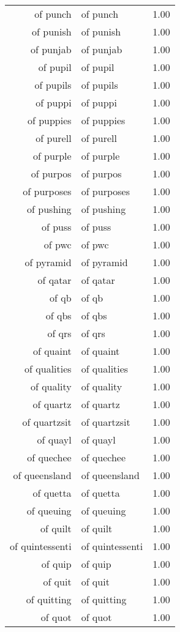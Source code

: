 \begin{table}[ht]
\begin{tabular}{rlr}
  of punch & of punch & 1.00 \\ 
  of punish & of punish & 1.00 \\ 
  of punjab & of punjab & 1.00 \\ 
  of pupil & of pupil & 1.00 \\ 
  of pupils & of pupils & 1.00 \\ 
  of puppi & of puppi & 1.00 \\ 
  of puppies & of puppies & 1.00 \\ 
  of purell & of purell & 1.00 \\ 
  of purple & of purple & 1.00 \\ 
  of purpos & of purpos & 1.00 \\ 
  of purposes & of purposes & 1.00 \\ 
  of pushing & of pushing & 1.00 \\ 
  of puss & of puss & 1.00 \\ 
  of pwc & of pwc & 1.00 \\ 
  of pyramid & of pyramid & 1.00 \\ 
  of qatar & of qatar & 1.00 \\ 
  of qb & of qb & 1.00 \\ 
  of qbs & of qbs & 1.00 \\ 
  of qrs & of qrs & 1.00 \\ 
  of quaint & of quaint & 1.00 \\ 
  of qualities & of qualities & 1.00 \\ 
  of quality & of quality & 1.00 \\ 
  of quartz & of quartz & 1.00 \\ 
  of quartzsit & of quartzsit & 1.00 \\ 
  of quayl & of quayl & 1.00 \\ 
  of quechee & of quechee & 1.00 \\ 
  of queensland & of queensland & 1.00 \\ 
  of quetta & of quetta & 1.00 \\ 
  of queuing & of queuing & 1.00 \\ 
  of quilt & of quilt & 1.00 \\ 
  of quintessenti & of quintessenti & 1.00 \\ 
  of quip & of quip & 1.00 \\ 
  of quit & of quit & 1.00 \\ 
  of quitting & of quitting & 1.00 \\ 
  of quot & of quot & 1.00 \\ 

\end{tabular}
\end{table}
